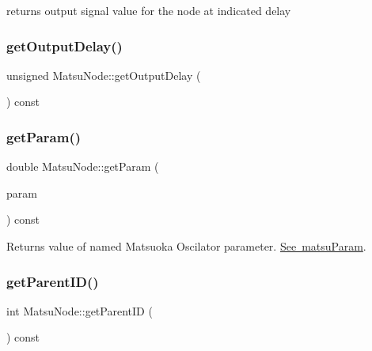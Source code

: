 returns output signal value for the node at indicated delay 

\mbox{\label{classMatsuNode_aaeed82f766fea6677f966b26f88b004d}} 
\subsubsection{\texorpdfstring{get\+Output\+Delay()}{getOutputDelay()}}
{\footnotesize\ttfamily unsigned Matsu\+Node\+::get\+Output\+Delay (\begin{DoxyParamCaption}{ }\end{DoxyParamCaption}) const}

\mbox{\label{classMatsuNode_ad2e3306938c413010f706c96ab9a7653}} 
\subsubsection{\texorpdfstring{get\+Param()}{getParam()}}
{\footnotesize\ttfamily double Matsu\+Node\+::get\+Param (\begin{DoxyParamCaption}\item[{\mbox{\hyperlink{classMatsuNode_aed801e1d0363292efc99bb02f1911386}{matsu\+Param}}}]{param }\end{DoxyParamCaption}) const}



Returns value of named Matsuoka Oscilator parameter. \mbox{\hyperlink{classMatsuNode_aed801e1d0363292efc99bb02f1911386}{See matsu\+Param}}. 

\mbox{\label{classMatsuNode_a82424915e6d706f75287de36bac0e328}} 
\subsubsection{\texorpdfstring{get\+Parent\+I\+D()}{getParentID()}}
{\footnotesize\ttfamily int Matsu\+Node\+::get\+Parent\+ID (\begin{DoxyParamCaption}{ }\end{DoxyParamCaption}) const}

